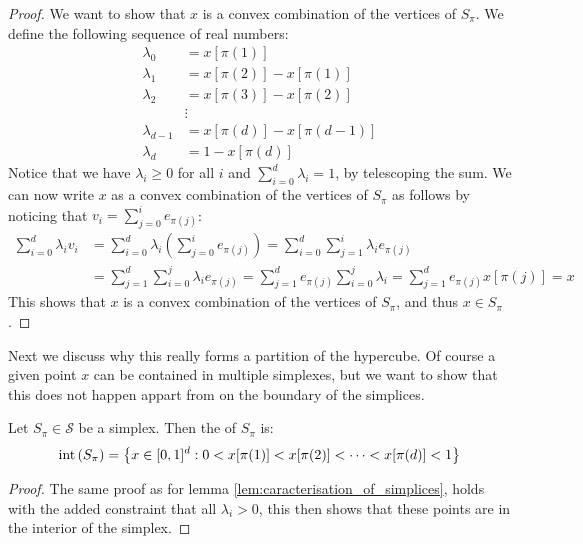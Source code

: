 \begin{proof}
    We want to show that $x$ is a convex combination of the vertices of $S_{\pi}$. We define the following sequence of real numbers:
    \begin{align*}
        \lambda_0     & = x[\pi(1)]               \\
        \lambda_1     & = x[\pi(2)] - x[\pi(1)]   \\
        \lambda_2     & = x[\pi(3)] - x[\pi(2)]   \\
                      & \vdots                    \\
        \lambda_{d-1} & = x[\pi(d)] - x[\pi(d-1)] \\
        \lambda_d     & = 1 - x[\pi(d)]
    \end{align*}
    Notice that we have $\lambda_i \geq 0$ for all $i$ and $\sum_{i=0}^{d} \lambda_i = 1$, by telescoping the sum. We can now write $x$ as a convex combination of the vertices of $S_{\pi}$ as follows by noticing that $v_i = \sum_{j=0}^{i} e_{\pi(j)}$:
    \begin{align*}
        \sum_{i=0}^{d} \lambda_i v_i & = \sum_{i=0}^{d} \lambda_i \left( \sum_{j=0}^{i} e_{\pi(j)} \right)  = \sum_{i=0}^{d} \sum_{j=1}^{i} \lambda_i e_{\pi(j)}                                \\
                                     & = \sum_{j=1}^{d} \sum_{i=0}^{j} \lambda_i e_{\pi(j)}  = \sum_{j=1}^{d} e_{\pi(j)} \sum_{i=0}^{j} \lambda_i		 = \sum_{j=1}^{d} e_{\pi(j)} x[\pi(j)]		     = x
    \end{align*}
    This shows that $x$ is a convex combination of the vertices of $S_{\pi}$, and thus $x \in S_{\pi}$.
\end{proof}
Next we discuss why this really forms a partition of the hypercube. Of course a given point $x$ can be contained in multiple simplexes, but we want to show that this does not happen appart from on the boundary of the simplices.
\begin{lemma}
    Let $S_{\pi} \in \mathcal{S}$ be a simplex. Then the  of $S_{\pi}$ is:
    \begin{align*}
        \text{int}\left(S_{\pi}\right) = \left\{x \in [0, 1]^d : 0 < x[\pi(1)] < x[\pi(2)] < \dots < x[\pi(d)] < 1\right\}
    \end{align*}
\end{lemma}
\begin{proof}
    The same proof as for lemma \ref{lem:caracterisation_of_simplices}, holds with the added constraint that all $\lambda_i > 0$, this then shows that these points are in the interior of the simplex.
\end{proof}
